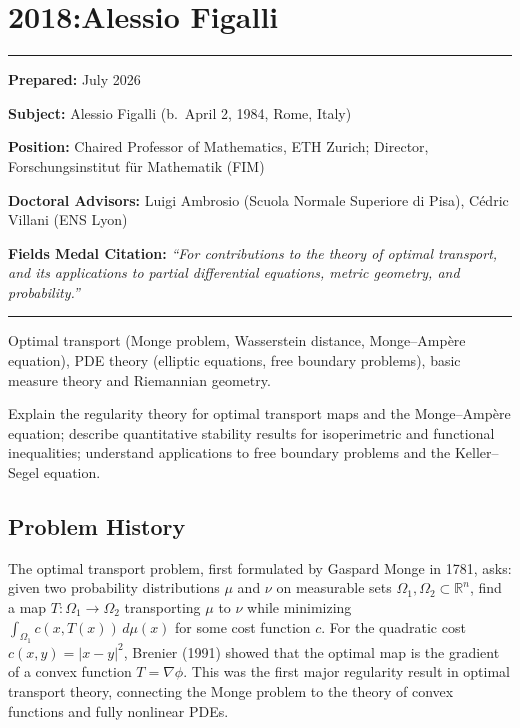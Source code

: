 \chapter{2018:Alessio Figalli}\label{ch2018alessiofigalli:alessio-figalli-fields-medal-2018-a-comprehensive-report-on-his-work-and-impact}

\begin{center}\rule{0.5\linewidth}{0.5pt}\end{center}

\textbf{Prepared:} July 2026

\textbf{Subject:} Alessio Figalli (b.\ April 2, 1984, Rome, Italy)

\textbf{Position:} Chaired Professor of Mathematics, ETH Zurich; Director, Forschungsinstitut f\"ur Mathematik (FIM)

\textbf{Doctoral Advisors:} Luigi Ambrosio (Scuola Normale Superiore di Pisa), C\'edric Villani (ENS Lyon)

\textbf{Fields Medal Citation:} \emph{``For contributions to the theory of optimal transport, and its applications to partial differential equations, metric geometry, and probability.''}

\begin{center}\rule{0.5\linewidth}{0.5pt}\end{center}

\begin{prereqs}
Optimal transport (Monge problem, Wasserstein distance, Monge--Amp\`ere equation), PDE theory (elliptic equations, free boundary problems), basic measure theory and Riemannian geometry.
\end{prereqs}

\begin{objectives}
Explain the regularity theory for optimal transport maps and the Monge--Amp\`ere equation; describe quantitative stability results for isoperimetric and functional inequalities; understand applications to free boundary problems and the Keller--Segel equation.
\end{objectives}

\section{Problem History}

The optimal transport problem, first formulated by Gaspard Monge in 1781, asks: given two probability distributions $\mu$ and $\nu$ on measurable sets $\Omega_1, \Omega_2 \subset \mathbb{R}^n$, find a map $T: \Omega_1 \to \Omega_2$ transporting $\mu$ to $\nu$ while minimizing $\int_{\Omega_1} c(x, T(x))\,d\mu(x)$ for some cost function $c$. For the quadratic cost $c(x,y) = |x-y|^2$, Brenier (1991) showed that the optimal map is the gradient of a convex function $T = \nabla\phi$. This was the first major regularity result in optimal transport theory, connecting the Monge problem to the theory of convex functions and fully nonlinear PDEs.

